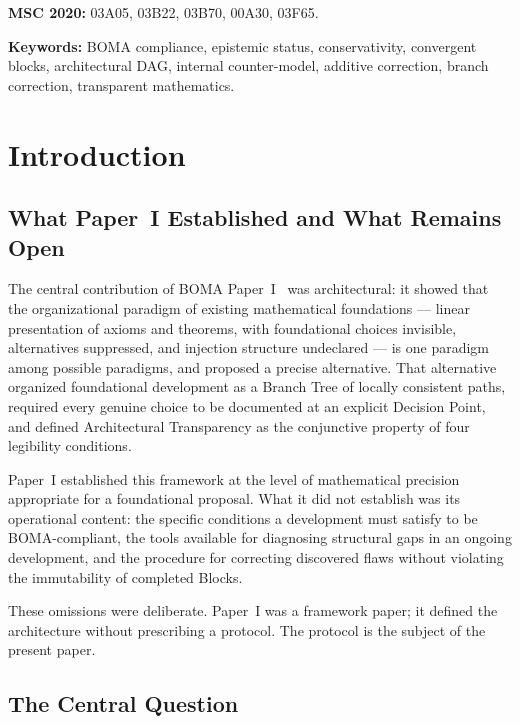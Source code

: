 \documentclass[12pt, a4paper]{article}
\theoremstyle{plain}
\theoremstyle{definition}
\theoremstyle{remark}
\newcommand{\BOMA}{\textsf{BOMA}}
\begin{document}
\medskip
\noindent\textbf{MSC 2020:}
03A05, 03B22, 03B70, 00A30, 03F65.

\medskip
\noindent\textbf{Keywords:}
\BOMA{} compliance,
epistemic status,
conservativity,
convergent blocks,
architectural DAG,
internal counter-model,
additive correction,
branch correction,
transparent mathematics.

\tableofcontents
\newpage

\section{Introduction}
\label{sec:introduction}

\subsection{What Paper~I Established and What Remains Open}
\label{subsec:paper1}

The central contribution of \BOMA{} Paper~I~\cite{BomaI} was
architectural: it showed that the organizational paradigm of existing
mathematical foundations --- linear presentation of axioms and
theorems, with foundational choices invisible, alternatives suppressed,
and injection structure undeclared --- is one paradigm among possible
paradigms, and proposed a precise alternative. That alternative
organized foundational development as a Branch Tree of locally
consistent paths, required every genuine choice to be documented at an
explicit Decision Point, and defined Architectural Transparency as the
conjunctive property of four legibility conditions.

Paper~I established this framework at the level of mathematical
precision appropriate for a foundational proposal. What it did not
establish was its operational content: the specific conditions a
development must satisfy to be \BOMA{}-compliant, the tools available
for diagnosing structural gaps in an ongoing development, and the
procedure for correcting discovered flaws without violating the
immutability of completed Blocks.

These omissions were deliberate. Paper~I was a framework paper; it
defined the architecture without prescribing a protocol. The protocol
is the subject of the present paper.

\subsection{The Central Question}
\label{subsec:question}
\end{document}
